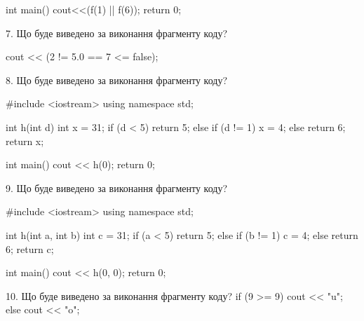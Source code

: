 \documentclass[11pt, ukrainian]{article}
\begin{document}
\begin{large}
int main(){
    cout<<(f(1) || f(6));
    return 0;
}


7. Що буде виведено за виконання фрагменту коду?

cout << (2 != 5.0 == 7 <= false);


8. Що буде виведено за виконання фрагменту коду?

#include <iostream>
using namespace std;

int h(int d){
    int x = 31;
    if (d < 5) 
        return 5;
    else if (d != 1)
         x = 4;
    else
         return 6;
    return x;
}

int main(){
    cout << h(0);
    return 0;
}



9. Що буде виведено за виконання фрагменту коду?

#include <iostream>
using namespace std;

int h(int a, int b){
    int c = 31;
    if (a < 5)
        return 5;
    else if (b != 1)
         c = 4;
    else 
        return 6;
    return c;
}

int main(){
    cout << h(0, 0);
    return 0;
}


10. Що буде виведено за виконання фрагменту коду?
if (9 >= 9)
    cout << "u";
else
    cout << "o";


\end{large}
\newpage
\end{document}
